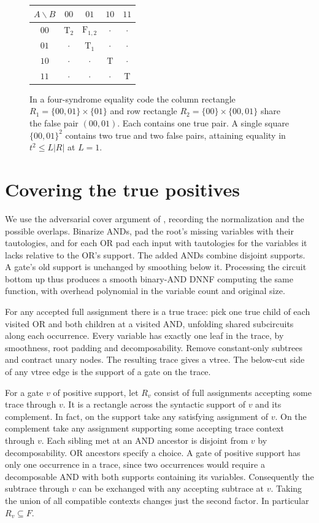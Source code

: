 \documentclass[11pt,a4paper]{amsart}
\begin{document}
\begin{figure}[t]
\centering
\begin{tabular}{c|cccc}
$A\backslash B$ & $00$ & $01$ & $10$ & $11$\\ \hline
$00$ & $\mathrm{T}_2$ & $\mathrm{F}_{1,2}$ & $\cdot$ & $\cdot$\\
$01$ & $\cdot$ & $\mathrm{T}_1$ & $\cdot$ & $\cdot$\\
$10$ & $\cdot$ & $\cdot$ & $\mathrm{T}$ & $\cdot$\\
$11$ & $\cdot$ & $\cdot$ & $\cdot$ & $\mathrm{T}$
\end{tabular}
\caption{In a four-syndrome equality code the column rectangle $R_1=\{00,01\}\times\{01\}$ and row rectangle $R_2=\{00\}\times\{00,01\}$ share the false pair $(00,01)$. Each contains one true pair. A single square $\{00,01\}^2$ contains two true and two false pairs, attaining equality in $t^2\leq L|R|$ at $L=1$.}
\end{figure}

\section{Covering the true positives}
We use the adversarial cover argument of \cite[Theorem~7]{thesis}, recording the normalization and the possible overlaps. Binarize ANDs, pad the root's missing variables with their tautologies, and for each OR pad each input with tautologies for the variables it lacks relative to the OR's support. The added ANDs combine disjoint supports. A gate's old support is unchanged by smoothing below it. Processing the circuit bottom up thus produces a smooth binary-AND DNNF computing the same function, with overhead polynomial in the variable count and original size.

For any accepted full assignment there is a true trace: pick one true child of each visited OR and both children at a visited AND, unfolding shared subcircuits along each occurrence. Every variable has exactly one leaf in the trace, by smoothness, root padding and decomposability. Remove constant-only subtrees and contract unary nodes. The resulting trace gives a vtree. The below-cut side of any vtree edge is the support of a gate on the trace.

For a gate $v$ of positive support, let $R_v$ consist of full assignments accepting some trace through $v$. It is a rectangle across the syntactic support of $v$ and its complement. In fact, on the support take any satisfying assignment of $v$. On the complement take any assignment supporting some accepting trace context through $v$. Each sibling met at an AND ancestor is disjoint from $v$ by decomposability. OR ancestors specify a choice. A gate of positive support has only one occurrence in a trace, since two occurrences would require a decomposable AND with both supports containing its variables. Consequently the subtrace through $v$ can be exchanged with any accepting subtrace at $v$. Taking the union of all compatible contexts changes just the second factor. In particular $R_v\subseteq F$.
\end{document}
